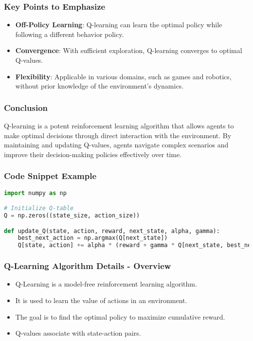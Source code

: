 \documentclass[aspectratio=169]{beamer}
\begin{document}
\begin{frame}[fragile]
    \frametitle{Key Points to Emphasize}
    
    \begin{itemize}
        \item \textbf{Off-Policy Learning}: Q-learning can learn the optimal policy while following a different behavior policy.
        \item \textbf{Convergence}: With sufficient exploration, Q-learning converges to optimal Q-values.
        \item \textbf{Flexibility}: Applicable in various domains, such as games and robotics, without prior knowledge of the environment’s dynamics.
    \end{itemize}
\end{frame}

\begin{frame}[fragile]
    \frametitle{Conclusion}
    
    Q-learning is a potent reinforcement learning algorithm that allows agents to make optimal decisions through direct interaction with the environment. By maintaining and updating Q-values, agents navigate complex scenarios and improve their decision-making policies effectively over time.
\end{frame}

\begin{frame}[fragile]
    \frametitle{Code Snippet Example}
    
    \begin{lstlisting}[language=Python]
import numpy as np

# Initialize Q-table
Q = np.zeros((state_size, action_size))

def update_Q(state, action, reward, next_state, alpha, gamma):
    best_next_action = np.argmax(Q[next_state])
    Q[state, action] += alpha * (reward + gamma * Q[next_state, best_next_action] - Q[state, action])
    \end{lstlisting}
\end{frame}

\begin{frame}[fragile]
    \frametitle{Q-Learning Algorithm Details - Overview}
    \begin{itemize}
        \item Q-Learning is a model-free reinforcement learning algorithm.
        \item It is used to learn the value of actions in an environment.
        \item The goal is to find the optimal policy to maximize cumulative reward.
        \item Q-values associate with state-action pairs.
    \end{itemize}
\end{frame}
\end{document}
